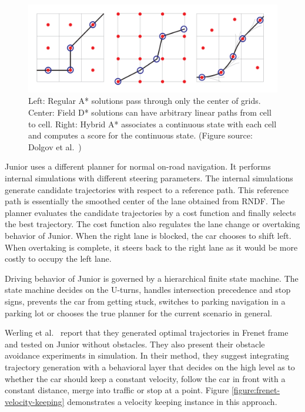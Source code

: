 \begin{figure}[h]
  \centering
  \includegraphics[width=.8\textwidth]{figures/hybridastar-comparison.png}
  \caption[A*, Field D* and Hybrid A* algorithms]{Left: Regular A* solutions
    pass through only the center of grids. Center: Field D* solutions can
    have arbitrary linear paths from cell to cell. Right: Hybrid A* associates
    a continuous state with each cell and computes a score for the continuous
  state. (Figure source: Dolgov et al.\ \cite{Dolgov2010PathPF})}
  \label{figure:hybridastar-comparison}
\end{figure}

Junior uses a different planner for normal on-road navigation. It performs
internal simulations with different steering parameters. The internal
simulations generate candidate trajectories with respect to a reference path.
This reference path is essentially the smoothed center of the lane obtained
from RNDF. The planner evaluates the candidate trajectories by a cost function
and finally selects the best trajectory. The cost function also regulates the
lane change or overtaking behavior of Junior. When the right lane is blocked,
the car chooses to shift left. When overtaking is complete, it steers back
to the right lane as it would be more costly to occupy the left lane.

Driving behavior of Junior is governed by a hierarchical finite state machine.
The state machine decides on the U-turns, handles intersection precedence and
stop signs, prevents the car from getting stuck, switches to parking navigation
in a parking lot or chooses the true planner for the current scenario in
general.

Werling et al.\ \cite{Werling2010OptimalTG} report that they generated optimal
trajectories in Frenet frame and tested on Junior without obstacles. They
also present their obstacle avoidance experiments in simulation. In their
method, they suggest integrating trajectory generation with a behavioral layer
that decides on the high level as to whether the car should keep a constant
velocity, follow the car in front with a constant distance, merge into
traffic or stop at a point. Figure \ref{figure:frenet-velocity-keeping}
demonstrates a velocity keeping instance in this approach.


